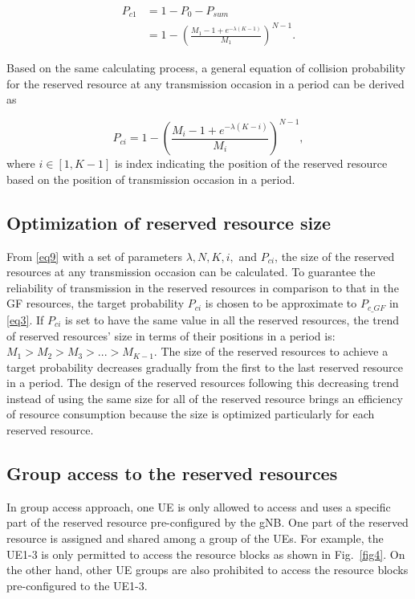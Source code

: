 \documentclass[conference]{IEEEtran}
\begin{document}
\begin{align}
P_{c1} &= 1 - P_{0} - P_{sum} \nonumber\\
 &= 1 - (\frac{M_{1}-1+e^{-\lambda(K-1)}}{M_{1}})^{N-1}.\label{eq8}
\end{align}

Based on the same calculating process, a general equation of collision probability for the reserved resource at any transmission occasion in a period can be derived as

\begin{equation}
P_{ci} = 1 - (\frac{M_{i}-1+e^{-\lambda(K-i)}}{M_{i}})^{N-1},\label{eq9}
\end{equation}
where
$i \in [1, K-1]$ is index indicating the position of the reserved resource based on the position of transmission occasion in a period.

\subsection{Optimization of reserved resource size}\label{IIDD}
From \eqref{eq9} with a set of parameters  $\lambda, N, K, i,$ and $P_{ci}$, the size of the reserved resources at any transmission occasion can be calculated. To guarantee the reliability of transmission in the reserved resources in comparison to that in the GF resources, the target probability $P_{ci}$ is chosen to be approximate to $P_{c\_GF}$ in \eqref{eq3}. If $P_{ci}$ is set to have the same value in all the reserved resources, the trend of reserved resources' size in terms of their positions in a period is: $M_1 > M_2 > M_3 > ... > M_{K-1}$. The size of the reserved resources to achieve a target probability decreases gradually from the first to the last reserved resource in a period. The design of the reserved resources following this decreasing trend instead of using the same size for all of the reserved resource brings an efficiency of resource consumption because the size is optimized particularly for each reserved resource.

\subsection{Group access to the reserved resources}\label{IIEE}
In group access approach, one UE is only allowed to access and uses a specific part of the reserved resource pre-configured by the gNB. One part of the reserved resource is assigned and shared among a group of the UEs. For example, the UE1-3 is only permitted to access the resource blocks as shown in Fig.~\ref{fig4}. On the other hand, other UE groups are also prohibited to access the resource blocks pre-configured to the UE1-3. 
\end{document}
